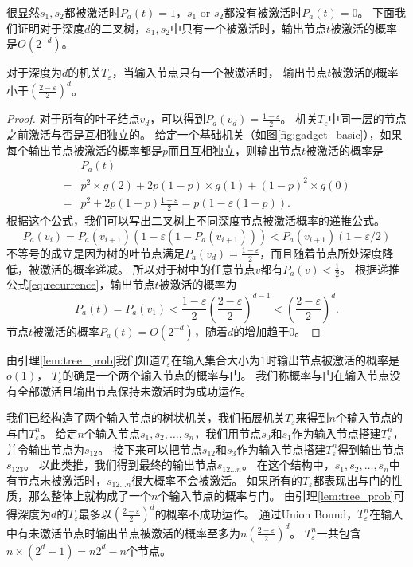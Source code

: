很显然$s_1,s_2$都被激活时$P_a(t)=1$，$s_1$ or $s_2$都没有被激活时$P_a(t)=0$。
下面我们证明对于深度$d$的二叉树，$s_1,s_2$中只有一个被激活时，输出节点$t$被激活的概率是$O(2^{-d})$。
\begin{lemma}
\label{lem:tree_prob}
对于深度为$d$的机关$T_\varepsilon$，当输入节点只有一个被激活时，
输出节点$t$被激活的概率小于$(\frac{2-\varepsilon}{2})^{d}$。
\end{lemma}
\begin{proof}
对于所有的叶子结点$v_d$，可以得到$P_a(v_d) = \frac{1-\varepsilon}{2}$。
机关$T_\varepsilon$中同一层的节点之前激活与否是互相独立的。
给定一个基础机关（如图\ref{fig:gadget_basic}），如果每个输出节点被激活的概率都是$p$而且互相独立，则输出节点$t$被激活的概率是
\begin{equation*}
\begin{array}{ll}
& P_a(t) \\
= & p^2\times g(2) + 2p(1-p)\times g(1) + (1-p)^2\times g(0) \\
= & p^2 + 2p(1-p)\frac{1-\varepsilon}{2} = p(1-\varepsilon(1-p)).
\end{array}
\end{equation*}
根据这个公式，我们可以写出二叉树上不同深度节点被激活概率的递推公式。
\begin{equation}
\label{eq:recurrence}
P_a(v_i) = P_a(v_{i+1})(1-\varepsilon(1-P_a(v_{i+1}))) <  P_a(v_{i+1})(1-\varepsilon/2)
\end{equation}
不等号的成立是因为树的叶节点满足$P_a(v_d) = \frac{1-\varepsilon}{2}$，而且随着节点所处深度降低，被激活的概率递减。
所以对于树中的任意节点$v$都有$P_a(v) < \frac{1}{2}$。
根据递推公式\ref{eq:recurrence}，输出节点$t$被激活的概率为
\begin{equation*}
\label{eq:p_a_t}
 P_a(t) 
=  P_a(v_1) 
<  \frac{1-\varepsilon}{2}(\frac{2-\varepsilon}{2})^{d-1} 
<  (\frac{2-\varepsilon}{2})^{d}.
\end{equation*}
节点$t$被激活的概率$P_a(t) = O(2^{-d})$，随着$d$的增加趋于$0$。
\end{proof}

由引理\ref{lem:tree_prob}我们知道$T_\varepsilon$在输入集合大小为$1$时输出节点被激活的概率是$o(1)$，
$T_\varepsilon$的确是一个两个输入节点的概率与门。
我们称概率与门在输入节点没有全部激活且输出节点保持未激活时为成功运作。


我们已经构造了两个输入节点的树状机关，我们拓展机关$T_\varepsilon$来得到$n$个输入节点的与门$T_\varepsilon^n$。
给定$n$个输入节点$s_1, s_2, \dots, s_n$，我们用节点$s_0$和$s_1$作为输入节点搭建$T_\varepsilon^n$，并令输出节点为$s_{12}$。
接下来可以把节点$s_{12}$和$s_{3}$作为输入节点搭建$T_\varepsilon^n$得到输出节点$s_{123}$。
以此类推，我们得到最终的输出节点$s_{12\dots n}$。
在这个结构中，$s_1, s_2, \dots, s_n$中有节点未被激活时，$s_{12\dots n}$很大概率不会被激活。
如果所有的$T_\varepsilon$都表现出与门的性质，那么整体上就构成了一个$n$个输入节点的概率与门。
由引理\ref{lem:tree_prob}可得深度为$d$的$T_\varepsilon$最多以$(\frac{2-\varepsilon}{2})^{d}$的概率不成功运作。
通过Union Bound，$T_\varepsilon^n$在输入中有未激活节点时输出节点被激活的概率至多为$n(\frac{2-\varepsilon}{2})^{d}$。
$T_\varepsilon^n$一共包含$n\times(2^d-1) = n2^d-n$个节点。



